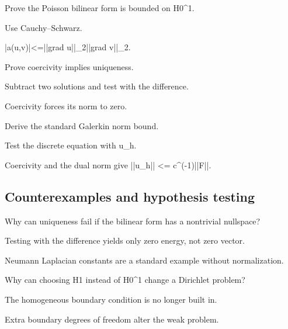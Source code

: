 \begin{exercise}[Boundedness]\label{exr:iii23-expand-07}
Prove the Poisson bilinear form is bounded on H0\textasciicircum{}1.
\end{exercise}
\begin{hint}
Use Cauchy--Schwarz.
\end{hint}
\begin{solution}
|a(u,v)|<=||grad u||\_2||grad v||\_2.
\end{solution}

\begin{exercise}\label{exr:iii23-expand-08}
Prove coercivity implies uniqueness.
\end{exercise}
\begin{hint}
Subtract two solutions and test with the difference.
\end{hint}
\begin{solution}
Coercivity forces its norm to zero.
\end{solution}

\begin{exercise}\label{exr:iii23-expand-09}
Derive the standard Galerkin norm bound.
\end{exercise}
\begin{hint}
Test the discrete equation with u\_h.
\end{hint}
\begin{solution}
Coercivity and the dual norm give ||u\_h|| <= c\textasciicircum{}(-1)||F||.
\end{solution}

\subsection*{Counterexamples and hypothesis testing}

\begin{exercise}[No coercivity]\label{exr:iii23-expand-10}
Why can uniqueness fail if the bilinear form has a nontrivial nullspace?
\end{exercise}
\begin{hint}
Testing with the difference yields only zero energy, not zero vector.
\end{hint}
\begin{solution}
Neumann Laplacian constants are a standard example without normalization.
\end{solution}

\begin{exercise}\label{exr:iii23-expand-11}
Why can choosing H1 instead of H0\textasciicircum{}1 change a Dirichlet problem?
\end{exercise}
\begin{hint}
The homogeneous boundary condition is no longer built in.
\end{hint}
\begin{solution}
Extra boundary degrees of freedom alter the weak problem.
\end{solution}

